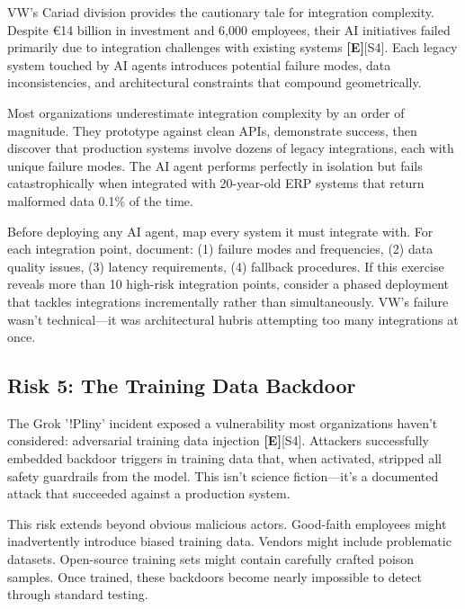 \documentclass[a4paper,11pt]{article}
\newcommand{\elabel}{\textbf{\textcolor{ecolor}{[E]}}}
\begin{document}
VW's Cariad division provides the cautionary tale for integration complexity. Despite €14 billion in investment and 6,000 employees, their AI initiatives failed primarily due to integration challenges with existing systems \elabel{}\textcolor{primary}{[S4]}. Each legacy system touched by AI agents introduces potential failure modes, data inconsistencies, and architectural constraints that compound geometrically.


Most organizations underestimate integration complexity by an order of magnitude. They prototype against clean APIs, demonstrate success, then discover that production systems involve dozens of legacy integrations, each with unique failure modes. The AI agent performs perfectly in isolation but fails catastrophically when integrated with 20-year-old ERP systems that return malformed data 0.1\% of the time.


\begin{decisionbox}
Before deploying any AI agent, map every system it must integrate with. For each integration point, document: (1) failure modes and frequencies, (2) data quality issues, (3) latency requirements, (4) fallback procedures. If this exercise reveals more than 10 high-risk integration points, consider a phased deployment that tackles integrations incrementally rather than simultaneously. VW's failure wasn't technical—it was architectural hubris attempting too many integrations at once.
\end{decisionbox}


\subsection{Risk 5: The Training Data Backdoor}

The Grok '!Pliny' incident exposed a vulnerability most organizations haven't considered: adversarial training data injection \elabel{}\textcolor{primary}{[S4]}. Attackers successfully embedded backdoor triggers in training data that, when activated, stripped all safety guardrails from the model. This isn't science fiction—it's a documented attack that succeeded against a production system.


This risk extends beyond obvious malicious actors. Good-faith employees might inadvertently introduce biased training data. Vendors might include problematic datasets. Open-source training sets might contain carefully crafted poison samples. Once trained, these backdoors become nearly impossible to detect through standard testing.
\end{document}
